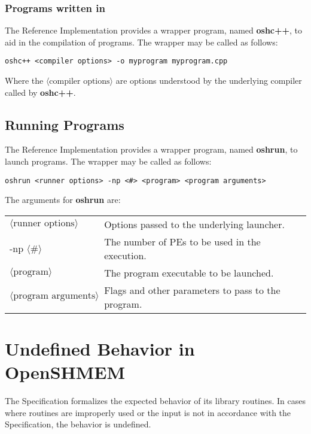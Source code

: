 \subsection*{Programs written in \Cpp}

The \openshmem Reference Implementation provides a wrapper program, named
\textbf{oshc++}, to aid in the compilation of \Cpp programs.
The wrapper may be called as follows:

\begin{lstlisting}[]
oshc++ <compiler options> -o myprogram myprogram.cpp
\end{lstlisting}
Where the $\langle\mbox{compiler options}\rangle$ are options understood by the
underlying \Cpp compiler called by \textbf{oshc++}.


\section{Running Programs}

The \openshmem Reference Implementation provides a wrapper program, named
\textbf{oshrun}, to launch \openshmem programs.
The wrapper may be called as follows:

\begin{lstlisting}[]
oshrun <runner options> -np <#> <program> <program arguments>
\end{lstlisting}
The arguments for \textbf{oshrun} are:

\begin{tabular}{p{}p{}}
$\langle\mbox{runner options}\rangle$ & {Options passed to the underlying launcher.}\tabularnewline
-np $\langle\mbox{\#}\rangle$ & {The number of \acp{PE} to be used in the execution.}\tabularnewline
$\langle\mbox{program}\rangle$ & {The program executable to be launched.}\tabularnewline
$\langle\mbox{program arguments}\rangle$ & {Flags and other parameters to pass to the program.}\tabularnewline
\end{tabular}




\chapter{Undefined Behavior in OpenSHMEM}\label{sec:undefined}

The \openshmem Specification formalizes the expected behavior of
its library routines.  In cases where routines are improperly used
or the input is not in accordance with the Specification, the behavior
is undefined.

